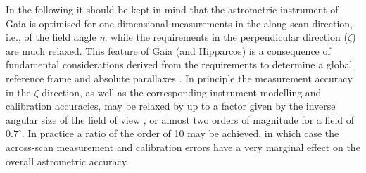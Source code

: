 \documentclass[structabstract]{aa}
\begin{document}
In the following it should be kept in mind that the astrometric instrument 
of Gaia is optimised for one-dimensional measurements in the along-scan
direction, i.e., of the field angle $\eta$, while the requirements in the 
perpendicular direction ($\zeta$) are much relaxed. This feature of Gaia
(and Hipparcos) is a consequence of fundamental considerations derived 
from the requirements to determine a global reference frame and absolute 
parallaxes \citep{2011EAS....45..109L}. In principle the measurement accuracy 
in the $\zeta$ direction, as well as the corresponding instrument modelling 
and calibration accuracies, may be relaxed by up to a factor given by the inverse angular 
size of the field of view \citep{2005ESASP.576...29L}, or almost two orders of 
magnitude for a field of $0.7^\circ$. In practice a ratio of the order of 10
may be achieved, in which case the across-scan measurement and calibration
errors have a very marginal effect on the overall astrometric accuracy.
 
\end{document}
